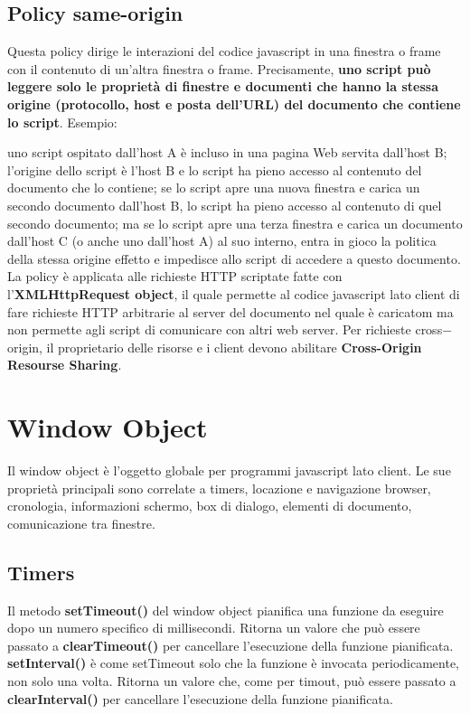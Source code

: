 \section{Policy same-origin}
Questa policy dirige le interazioni del codice javascript in una finestra  o frame con il contenuto di un'altra finestra o frame. Precisamente, \textbf{uno script può leggere solo le proprietà di finestre e documenti che hanno la stessa origine (protocollo, host e posta dell'URL) del documento che contiene lo script}. Esempio:

uno script ospitato dall'host A è incluso in una pagina Web servita dall'host B; l'origine dello script è l'host B e lo script ha pieno accesso al contenuto del documento che lo contiene;
se lo script apre una nuova finestra e carica un secondo documento dall'host B, lo script ha pieno accesso al contenuto di quel secondo documento; ma se lo script apre una terza finestra e carica un documento dall'host C (o anche uno dall'host A) al suo interno, entra in gioco la politica della stessa origine effetto e impedisce allo script di accedere a questo documento.\\

La policy è applicata alle richieste HTTP scriptate fatte con l'\textbf{XMLHttpRequest object}, il quale permette al codice javascript lato client di fare richieste HTTP arbitrarie al server del documento nel quale è caricatom ma non permette agli script di comunicare con altri web server. Per richieste cross$-$origin, il proprietario delle risorse e i client devono abilitare \textbf{Cross-Origin Resourse Sharing}. 


\chapter{Window Object}
Il window object è l'oggetto globale per programmi javascript lato client. Le sue proprietà principali sono correlate a timers, locazione e navigazione browser, cronologia, informazioni schermo, box di dialogo, elementi di documento, comunicazione tra finestre.

\section{Timers}
Il metodo \textbf{setTimeout()} del window object pianifica una funzione da eseguire dopo un numero specifico di millisecondi. Ritorna un valore che può essere passato a \textbf{clearTimeout()} per cancellare l'esecuzione della funzione pianificata. \textbf{setInterval()} è come setTimeout solo che la funzione è invocata periodicamente, non solo una volta. Ritorna un valore che, come per timout, può essere passato a \textbf{clearInterval()} per cancellare l'esecuzione della funzione pianificata.

